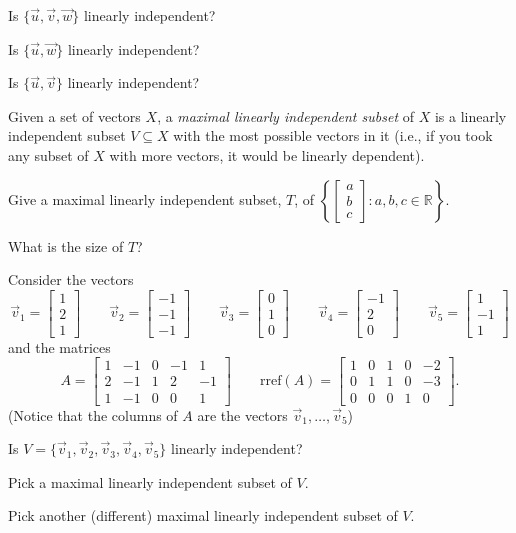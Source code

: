 \documentclass[14pt]{problemset}
\newcommand{\R}{\mathbb{R}}
\newcommand{\Span}{\mathrm{span}\,}
\newcommand{\rref}{\mathrm{rref}}
\newcommand{\mat}[1]{\begin{bmatrix}#1\end{bmatrix}}
\begin{document}
	\begin{parts}[resume]
		\item Is $\{\vec u,\vec v,\vec w\}$ linearly independent?
		\item Is $\{\vec u,\vec w\}$ linearly independent?
		\item Is $\{\vec u,\vec v\}$ linearly independent?
	\end{parts}

	\begin{definition}
	Given a set of vectors $X$, a 
	\emph{maximal linearly independent subset} of $X$ is a linearly independent
	subset $V\subseteq X$ with the most possible vectors in it 
	(i.e., if you took any subset of $X$ with more vectors, it would be linearly
	dependent).
	\end{definition}

	\question
	\begin{parts}
		\item Give a maximal linearly independent subset, $T$, of
		$\left\{\mat{a\\b\\c}:a,b,c\in \R\right\}$.
		\item What is the size of $T$?
	\end{parts}

	\question
	Consider the vectors
	\[
		\vec v_1=\mat{1\\2\\1}
		\qquad
		\vec v_2=\mat{-1\\-1\\-1}
		\qquad
		\vec v_3=\mat{0\\1\\0}
		\qquad
		\vec v_4=\mat{-1\\2\\0}
		\qquad
		\vec v_5=\mat{1\\-1\\1}
	\]
	and the matrices
	\[
		A=\mat{1&-1&0&-1&1\\ 2&-1&1&2&-1\\1 & -1&0&0&1}
		\qquad \rref (A)
		=\mat{1&0&1&0&-2\\0&1&1&0&-3\\0&0&0&1&0}.
	\]
	(Notice that the columns of $A$ are the vectors $\vec v_1,\ldots, \vec v_5$)

	\begin{parts}
		\item Is $V=\{\vec v_1,\vec v_2,\vec v_3,\vec v_4,\vec v_5\}$ linearly
		independent?
		\item Pick a maximal linearly independent subset of $V$.
		\item Pick another (different) maximal linearly independent subset of $V$.
	\end{parts}
\end{document}

